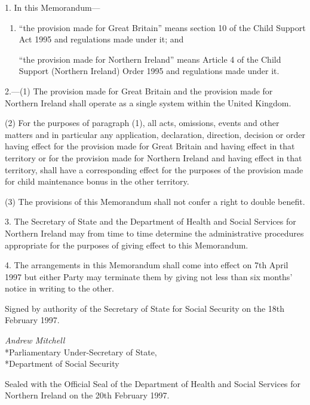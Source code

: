 \documentclass[12pt,a4paper]{article}
\begin{document}
1.  In this Memorandum—
\begin{enumerate}\item[]
“the provision made for Great Britain” means section 10 of the Child Support Act 1995 and regulations made under it; and

“the provision made for Northern Ireland” means Article 4 of the Child Support (Northern Ireland) Order 1995 and regulations made under it.
\end{enumerate}

\medskip

2.—(1) The provision made for Great Britain and the provision made for Northern Ireland shall operate as a single system within the United Kingdom.

(2) For the purposes of paragraph (1), all acts, omissions, events and other matters and in particular any application, declaration, direction, decision or order having effect for the provision made for Great Britain and having effect in that territory or for the provision made for Northern Ireland and having effect in that territory, shall have a corresponding effect for the purposes of the provision made for child maintenance bonus in the other territory.

(3) The provisions of this Memorandum shall not confer a right to double benefit.

\medskip

3.  The Secretary of State and the Department of Health and Social Services for Northern Ireland may from time to time determine the administrative procedures appropriate for the purposes of giving effect to this Memorandum.

\medskip

4.  The arrangements in this Memorandum shall come into effect on 7th April 1997 but either Party may terminate them by giving not less than six months’ notice in writing to the other.

\bigskip

Signed by authority of the Secretary of State for Social Security on the 18th February 1997.

{\raggedleft
\emph{Andrew Mitchell}\\*Parliamentary Under-Secretary of State,\\*Department of Social Security

}


\bigskip


Sealed with the Official Seal of the Department of Health and Social Services for Northern Ireland on the 20th February 1997.
\end{document}
